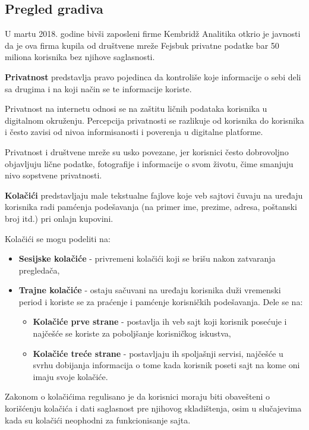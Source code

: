 \documentclass[a4paper, 12pt]{article}
\begin{document}
\subsection{Pregled gradiva}

U martu 2018. godine bivši zaposleni firme Kembridž Analitika otkrio je javnosti da je ova firma kupila od društvene mreže Fejsbuk privatne podatke bar 50 miliona korisnika bez njihove saglasnosti. 

\textbf{Privatnost} predstavlja pravo pojedinca da kontroliše koje informacije o sebi
deli sa drugima i na koji način se te informacije koriste.

Privatnost na internetu odnosi se na zaštitu ličnih podataka korisnika u digitalnom
okruženju. Percepcija privatnosti se razlikuje od korisnika do korisnika i
često zavisi od nivoa informisanosti i poverenja u digitalne platforme.

Privatnost i društvene mreže su usko povezane, jer korisnici često dobrovoljno
objavljuju lične podatke, fotografije i informacije o svom životu, čime smanjuju
nivo sopstvene privatnosti.

\vspace{\baselineskip}

\textbf{Kolačići} predstavljaju male tekstualne fajlove koje veb sajtovi čuvaju na uređaju
korisnika radi pamćenja podešavanja (na primer ime, prezime, adresa, poštanski broj itd.) pri onlajn kupovini.

Kolačići se mogu podeliti na:
\begin{itemize}
    \item \textbf{Sesijske kolačiće} - privremeni kolačići koji se brišu nakon zatvaranja
    pregledača,
    \item \textbf{Trajne kolačiće} - ostaju sačuvani na uređaju korisnika duži vremenski
    period i koriste se za praćenje i pamćenje korisničkih podešavanja. Dele se na:
    \begin{itemize}
        \item \textbf{Kolačiće prve strane} - postavlja ih veb sajt koji korisnik posećuje i  najčešće se koriste za poboljšanje korisničkog iskustva,
        \item \textbf{Kolačiće treće strane} - postavljaju ih spoljašnji servisi, najčešće
        u svrhu dobijanja informacija o tome kada korisnik poseti sajt na kome oni imaju svoje kolačiće.
    \end{itemize}
\end{itemize}


Zakonom o kolačićima regulisano je da korisnici moraju biti obavešteni o korišćenju
kolačića i dati saglasnost pre njihovog skladištenja, osim u slučajevima kada su
kolačići neophodni za funkcionisanje sajta.
\end{document}
